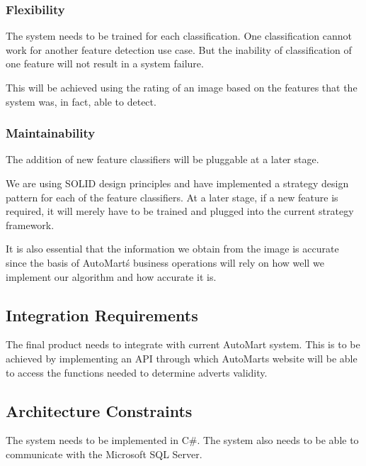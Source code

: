 \subsubsection{Flexibility}
The system needs to be trained for each classification. One classification cannot work for another feature detection use case. But the inability of classification of one feature will not result in a system failure. 

This will be achieved using the rating of an image based on the features that the system was, in fact, able to detect.
\subsubsection{Maintainability}
The addition of new feature classifiers will be pluggable at a later stage. 

We are using SOLID design principles and have implemented a strategy design pattern for each of the feature classifiers. At a later stage, if a new feature is required, it will merely have to be trained and plugged into the current strategy framework.

It is also essential that the information we obtain from the image is accurate since the basis of AutoMart\'s business operations will rely on how well we implement our algorithm and how accurate it is.

\subsection{Integration Requirements}
The final product needs to integrate with current AutoMart system. This is to be achieved by implementing an API through which AutoMarts website will be able to access the functions needed to determine adverts validity.

\subsection{Architecture Constraints}
The system needs to be implemented in C\#. The system also needs to be able to communicate with the Microsoft SQL Server.